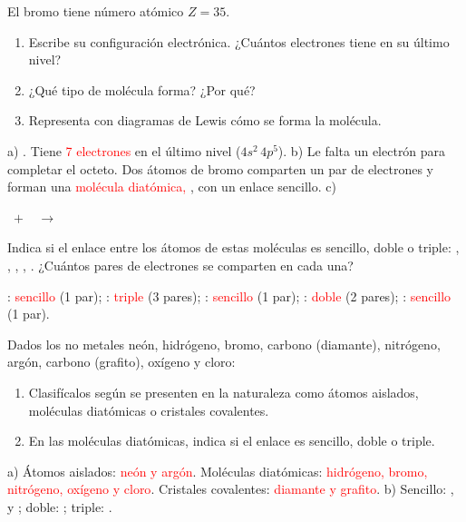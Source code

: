 \begin{exercise}
    El bromo tiene número atómico \(Z = 35\).
    \begin{enumerate}[label=\alph*)]
        \item Escribe su configuración electrónica. ¿Cuántos electrones tiene en su último nivel?
        \item ¿Qué tipo de molécula forma? ¿Por qué?
        \item Representa con diagramas de Lewis cómo se forma la molécula.
    \end{enumerate}
    \begin{solu}
        a) . Tiene \textcolor{red}{7 electrones} en el último nivel (\(4s^2\,4p^5\)).
        b) Le falta un electrón para completar el octeto. Dos átomos de bromo comparten un par de electrones y forman una \textcolor{red}{molécula diatómica, }, con un enlace sencillo.
        c)
        \begin{center}
             \(\;+\;\)  \(\;\longrightarrow\;\) 
        \end{center}
    \end{solu}
\end{exercise}

\begin{exercise}
    Indica si el enlace entre los átomos de estas moléculas es sencillo, doble o triple: , , , , . ¿Cuántos pares de electrones se comparten en cada una?
    \begin{solu}
        : \textcolor{red}{sencillo} (1 par); : \textcolor{red}{triple} (3 pares); : \textcolor{red}{sencillo} (1 par); : \textcolor{red}{doble} (2 pares); : \textcolor{red}{sencillo} (1 par).
    \end{solu}
\end{exercise}

\begin{exercise}
    Dados los no metales neón, hidrógeno, bromo, carbono (diamante), nitrógeno, argón, carbono (grafito), oxígeno y cloro:
    \begin{enumerate}[label=\alph*)]
        \item Clasifícalos según se presenten en la naturaleza como átomos aislados, moléculas diatómicas o cristales covalentes.
        \item En las moléculas diatómicas, indica si el enlace es sencillo, doble o triple.
    \end{enumerate}
    \begin{solu}
        a) Átomos aislados: \textcolor{red}{neón y argón}. Moléculas diatómicas: \textcolor{red}{hidrógeno, bromo, nitrógeno, oxígeno y cloro}. Cristales covalentes: \textcolor{red}{diamante y grafito}.
        b) Sencillo: ,  y ; doble: ; triple: .
    \end{solu}
\end{exercise}

